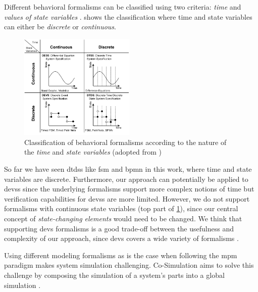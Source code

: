 \documentclass{jot}
\begin{document}
Different behavioral formalisms can be classified using two criteria: \textit{time} and \textit{values of state variables} \cite{wainerDiscreteeventModelingSimulation2009}.
 shows the classification where time and state variables can either be \textit{discrete} or \textit{continuous}.

\begin{figure}[ht!]
    \centering
    \includegraphics[width=0.49\textwidth]{figures/diagrams-classification.pdf}
    \caption{Classification of behavioral formalisms according to the nature of the \textit{time} and \textit{state variables} (adopted from \cite{wainerDiscreteeventModelingSimulation2009, amraniMultiparadigmModellingCyber2021})}
    \label{fig:classification}
\end{figure}

So far we have seen \glspl*{dtds} like \gls*{fsm} and \gls*{bpmn} in this work, where time and state variables are discrete.
Furthermore, our approach can potentially be applied to \glspl*{devs} since the underlying formalisms support more complex notions of time but verification capabilities for \glspl*{devs} are more limited.
However, we do not support formalisms with continuous state variables (top part of \cref{fig:classification}), since our central concept of \textit{state-changing elements} would need to be changed.
We think that supporting \gls*{devs} formalisms is a good trade-off between the usefulness and complexity of our approach, since \gls*{devs} covers a wide variety of formalisms \cite{vangheluweIntroductionMultiparadigmModelling2002}.

Using different modeling formalisms as is the case when
following the \gls*{mpm} paradigm makes system simulation challenging.
Co-Simulation aims to solve this challenge by composing the simulation of a system's parts into a global simulation \cite{gomesCoSimulationSurvey2019}.
\end{document}
